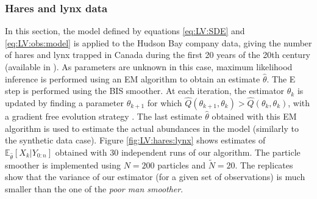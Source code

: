 \documentclass{article}
\def\pE{\mathbb{E}}
\newcommand{\epart}[2]{\ensuremath{\xi_{#1}^{#2}}}
\begin{document}
\subsubsection*{Hares and lynx data}

In this section, the model defined by equations \eqref{eq:LV:SDE} and \eqref{eq:LV:obs:model} is applied to the Hudson Bay company data, giving the number of hares and lynx trapped in Canada during the first 20 years of the 20th century (available in \cite{odum1971fundamentals}). As parameters are unknown in this case, maximum likelihood inference is performed using an EM \cite{dempster1977maximum} algorithm to obtain an estimate $\hat{\theta}$.
The E step is performed using the BIS smoother.
At each iteration, the estimator $\theta_k$ is updated by finding a parameter $\theta_{k+1}$ for which $\hat Q(\theta_{k+1},\theta_k) >  \hat Q(\theta_k,\theta_k)$, with  a gradient free evolution strategy \cite{hansen2006cma}. 
The last estimate $\hat{\theta}$ obtained with this EM algorithm  is used to  estimate the actual abundances in the model (similarly to the synthetic data case). 
Figure \ref{fig:LV:hares:lynx} shows  estimates of $\pE_{\hat{\theta}}\left[ X_k \vert Y_{0:n}\right]$ obtained with 30 independent runs of our algorithm. 
The particle smoother is implemented using $N = 200$ particles and $\tilde{N}=20$. 
The replicates show that the variance of our estimator (for a given set of observations) is much smaller than the one of the {\em poor man smoother}. 

\end{document}
